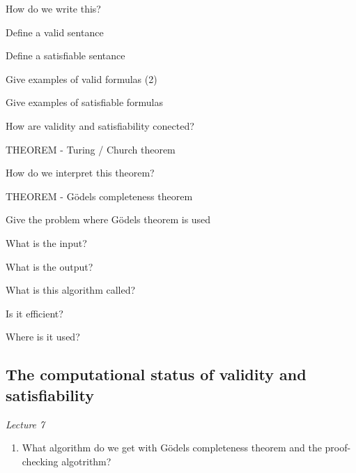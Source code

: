 \documentclass[fleqn]{article}
\begin{document}
\begin{enumerate}
    \item How do we write this?
    {\color{red}\item Define a valid sentance}
    \item Define a satisfiable sentance
    {\color{red}\item Give examples of valid formulas (2)}
    {\color{red}\item Give examples of satisfiable formulas}
    \item How are validity and satisfiability conected?
    {\color{red}\item THEOREM - Turing / Church theorem}
    {\color{red}\item How do we interpret this theorem?}
    {\color{red}\item THEOREM  - Gödels completeness theorem}
    {\color{red}\item Give the problem where Gödels theorem is used}
    \begin{itemize}
        {\color{red}\item What is the input?}
        {\color{red}\item What is the output?}
        {\color{red}\item What is this algorithm called?}
        {\color{red}\item Is it efficient?}
        {\color{red}\item Where is it used?}
    \end{itemize}
\end{enumerate}


\subsection{The computational status of validity and satisfiability}
\textit{Lecture 7}
\begin{enumerate}
    \item What algorithm do we get with Gödels completeness theorem and the proof-checking algotrithm?
\end{enumerate}
\end{document}
